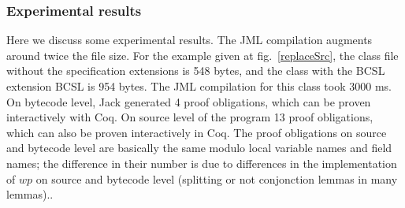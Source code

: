 
\subsubsection{Experimental results}
Here we discuss some experimental results. 
The JML compilation augments around twice the file size. 
For the example given at fig.~\ref{replaceSrc}, the class file without the specification extensions is 548 bytes, 
and the class with the BCSL extension BCSL is 954 bytes. The JML compilation for this class took 3000 ms. On bytecode level, Jack generated 4 proof obligations,  
which can be proven interactively with Coq. On source level of the program 13 proof obligations, 
which can also be proven interactively in Coq. The proof obligations on source and bytecode level are basically the same modulo 
 local variable names and field names; the difference in their number is due to differences in the implementation of $wp$ on source and bytecode level (splitting or not conjonction lemmas in many lemmas).. 

